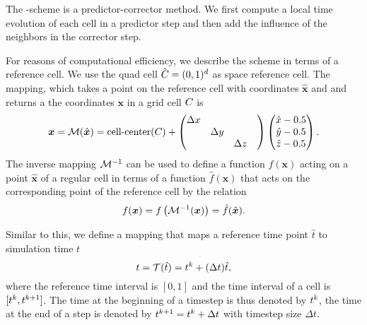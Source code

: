 The \aderdg{}-scheme is a predictor-corrector method.
We first compute a local time evolution of each cell in a predictor step and then add the influence of the neighbors in the corrector step.

For reasons of computational efficiency, we describe the scheme in terms of a reference cell.
We use the quad cell $\hat{C_{}} = (0, 1)^d$ as space reference cell.
The mapping, which takes a point on the reference cell with coordinates $\hat{\bm{x}}$ and and returns a the coordinates $\bm{x}$ in a grid cell $C_{}$ is
\begin{equation}\label{eq:space-mapping}
  \bm{x} = \mathcal{M} (\hat{\bm{x}}) =
  \operatorname{cell-center}(C_{}) +
\begin{pmatrix}
\Delta x && \\
&\Delta y & \\
&&\Delta z&
\end{pmatrix}
  \begin{pmatrix}
    \hat{x} - 0.5\\
    \hat{y} - 0.5\\
    \hat{z} - 0.5
  \end{pmatrix}.
\end{equation}
The inverse mapping $\mathcal{M}^{-1}$ can be used to define a function $f(\bm{x})$ acting on a point $\hat{\bm{x}}$ of a regular cell in terms of a function $\hat{f}(\bm{x})$ that acts on the corresponding point of the reference cell by the relation
\begin{equation}
  \label{eq:function-ref-cell}
  f(\bm{x}) = f\left( \mathcal{M}^{-1}(\bm{x}) \right) = \hat{f}(\hat{\bm{x}}).
\end{equation}

Similar to this, we define a mapping that maps a reference time point $\hat t$ to simulation time $t$
\newcommand{\timeMapping}{\mathcal{T}}
\begin{equation}
  \label{eq:time-mapping}
  t = \timeMapping(\hat{t}) = \curTime + (\Delta t) \hat{t},
\end{equation}
where the reference time interval is $[0,1]$ and the time interval of a cell is $[t^k, t^{k+1}]$.
The time at the beginning of a timestep is thus denoted by $t^k$, the time at the end of a step is denoted by $t^{k+1} = t^k + \Delta t$ with timestep size $\Delta t$.

